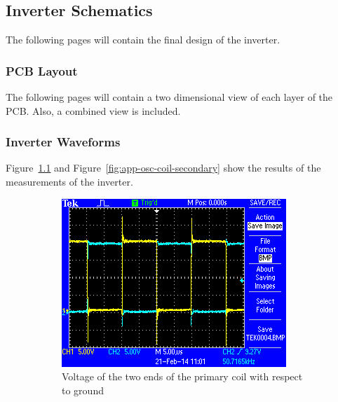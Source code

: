 \documentclass[11pt,titlepage]{report}
\begin{document}
\begin{appendices}
\chapter{Inverter Schematics}
\label{app:schematics}
The following pages will contain the final design of the inverter.

\subsection{PCB Layout}
\label{app:pcb_layout}
The following pages will contain a two dimensional view of each layer of the PCB. Also, a combined view is included.

\subsection{Inverter Waveforms}
Figure~\ref{fig:app-osc-coil-primary} and Figure~\ref{fig:app-osc-coil-secondary} show the results of the measurements of the inverter.
\label{app:waveforms}
\begin{figure}[H]
	\begin{center}
		\begin{subfigure}[h]{0.48\textwidth}
			\includegraphics[width=\textwidth]{resource/osc-coil-primary.png}
			\caption{Voltage of the two ends of the primary coil with respect to ground}
			\label{fig:app-osc-coil-primary}
		\end{subfigure}
		\quad
		\begin{subfigure}[h]{0.48\textwidth}

\end{subfigure}
\end{center}
\end{figure}
\end{appendices}
\end{document}
